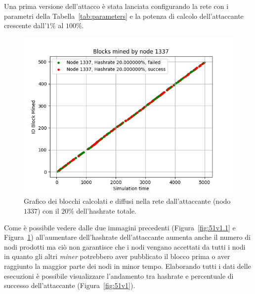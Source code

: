 Una prima versione dell'attacco è stata lanciata configurando la rete con i parametri della Tabella~\ref{tab:parameters} e la potenza di calcolo dell'attaccante crescente dall'$1\%$ al $100\%$.
\begin{figure}[H]
    \centering
    \includegraphics[width=\textwidth]{./images/1337-test-51-20.png}
    \caption{Grafico dei blocchi calcolati e diffusi nella rete dall'attaccante (nodo $1337$) con il $20\%$ dell'hashrate totale.}
    \label{fig:51v1.20}
\end{figure}
Come è possibile vedere dalle due immagini precedenti (Figura~\ref{fig:51v1.1} e Figura~\ref{fig:51v1.20}) all'aumentare dell'hashrate dell'attaccante aumenta anche il numero di nodi prodotti ma ciò non garantisce che i nodi vengano accettati da tutti i nodi in quanto gli altri \textit{miner} potrebbero aver pubblicato il blocco prima o aver raggiunto la maggior parte dei nodi in minor tempo.\newline
Elaborando tutti i dati delle esecuzioni è possibile visualizzare l'andamento tra hashrate e percentuale di successo dell'attaccante (Figura~\ref{fig:51v1}).
